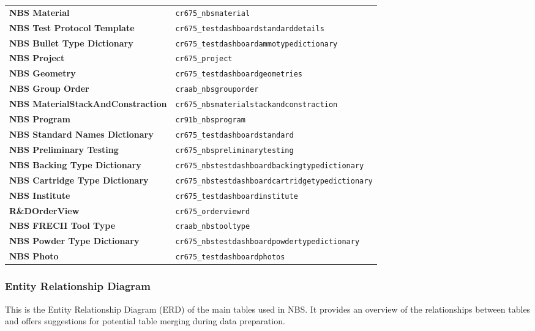 \begin{footnotesize}
\begin{tabularx}{\textwidth}{l|l}
		\textbf{NBS Material} & \texttt{cr675\_nbsmaterial} \\[0.5em]
		\textbf{NBS Test Protocol Template} & \texttt{cr675\_testdashboardstandarddetails} \\[0.5em]
		\textbf{NBS Bullet Type Dictionary} & \texttt{cr675\_testdashboardammotypedictionary} \\[0.5em]
		\textbf{NBS Project} & \texttt{cr675\_project} \\[0.5em]
		\textbf{NBS Geometry} & \texttt{cr675\_testdashboardgeometries} \\[0.5em]
		\textbf{NBS Group Order} & \texttt{craab\_nbsgrouporder} \\[0.5em]
		\textbf{NBS MaterialStackAndConstraction} & \texttt{cr675\_nbsmaterialstackandconstraction} \\[0.5em]
		\textbf{NBS Program} & \texttt{cr91b\_nbsprogram} \\[0.5em]
		\textbf{NBS Standard Names Dictionary} & \texttt{cr675\_testdashboardstandard} \\[0.5em]
		\textbf{NBS Preliminary Testing} & \texttt{cr675\_nbspreliminarytesting} \\[0.5em]
		\textbf{NBS Backing Type Dictionary} & \texttt{cr675\_nbstestdashboardbackingtypedictionary} \\[0.5em]
		\textbf{NBS Cartridge Type Dictionary} & \texttt{cr675\_nbstestdashboardcartridgetypedictionary} \\[0.5em]
		\textbf{NBS Institute} & \texttt{cr675\_testdashboardinstitute} \\[0.5em]
		\textbf{R\&DOrderView} & \texttt{cr675\_orderviewrd} \\[0.5em]
		\textbf{NBS FRECII Tool Type} & \texttt{craab\_nbstooltype} \\[0.5em]
		\textbf{NBS Powder Type Dictionary} & \texttt{cr675\_nbstestdashboardpowdertypedictionary} \\[0.5em]
		\textbf{NBS Photo} & \texttt{cr675\_testdashboardphotos} \\[0.5em]
	\end{tabularx}
\end{footnotesize}

\subsubsection{Entity Relationship Diagram}

This is the Entity Relationship Diagram (ERD) of the main tables used in NBS. It provides an overview of the relationships between tables and offers suggestions for potential table merging during data preparation.


